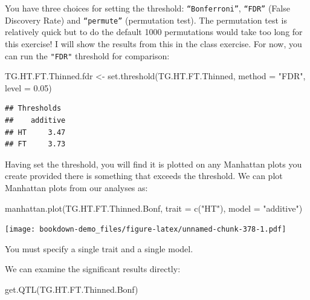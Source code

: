 \documentclass[
]{book}
\newenvironment{Shaded}{\begin{snugshade}}{\end{snugshade}}
\newcommand{\AttributeTok}[1]{\textcolor[rgb]{0.77,0.63,0.00}{#1}}
\newcommand{\FloatTok}[1]{\textcolor[rgb]{0.00,0.00,0.81}{#1}}
\newcommand{\FunctionTok}[1]{\textcolor[rgb]{0.00,0.00,0.00}{#1}}
\newcommand{\NormalTok}[1]{#1}
\newcommand{\OtherTok}[1]{\textcolor[rgb]{0.56,0.35,0.01}{#1}}
\newcommand{\StringTok}[1]{\textcolor[rgb]{0.31,0.60,0.02}{#1}}
\begin{document}
You have three choices for setting the threshold: \texttt{“Bonferroni”}, \texttt{“FDR”} (False Discovery Rate) and \texttt{“permute”} (permutation test). The permutation test is relatively quick but to do the default 1000 permutations would take too long for this exercise! I will show the results from this in the class exercise. For now, you can run the \texttt{"FDR"} threshold for comparison:

\begin{Shaded}
\begin{Highlighting}[]
\NormalTok{TG.HT.FT.Thinned.fdr }\OtherTok{\textless{}{-}} \FunctionTok{set.threshold}\NormalTok{(TG.HT.FT.Thinned, }\AttributeTok{method =} \StringTok{"FDR"}\NormalTok{, }
    \AttributeTok{level =} \FloatTok{0.05}\NormalTok{)}
\end{Highlighting}
\end{Shaded}

\begin{verbatim}
## Thresholds
##    additive
## HT     3.47
## FT     3.73
\end{verbatim}

Having set the threshold, you will find it is plotted on any Manhattan plots you create provided there is something that exceeds the threshold. We can plot Manhattan plots from our analyses as:

\begin{Shaded}
\begin{Highlighting}[]
\FunctionTok{manhattan.plot}\NormalTok{(TG.HT.FT.Thinned.Bonf, }\AttributeTok{trait =} \FunctionTok{c}\NormalTok{(}\StringTok{"HT"}\NormalTok{), }\AttributeTok{model =} \StringTok{"additive"}\NormalTok{)}
\end{Highlighting}
\end{Shaded}

\texttt{[image: bookdown-demo\_files/figure-latex/unnamed-chunk-378-1.pdf]}

You must specify a single trait and a single model.

We can examine the significant results directly:

\begin{Shaded}
\begin{Highlighting}[]
\FunctionTok{get.QTL}\NormalTok{(TG.HT.FT.Thinned.Bonf)}
\end{Highlighting}
\end{Shaded}
\end{document}
